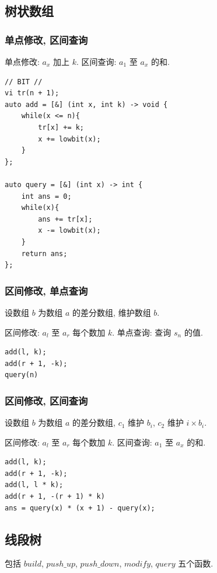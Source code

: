 \documentclass[UTF8, a4paper, titlepage, twoside]{ctexart}
\begin{document}
\subsection{ 树状数组 }

\subsubsection{ 单点修改, 区间查询 }
单点修改: $a_x$ 加上 $k$.
区间查询: $a_1$ 至 $a_x$ 的和.
\begin{lstlisting}[style = cpp]
// BIT //
vi tr(n + 1);
auto add = [&] (int x, int k) -> void {
    while(x <= n){
        tr[x] += k;
        x += lowbit(x);
    }
};

auto query = [&] (int x) -> int {
    int ans = 0;
    while(x){
        ans += tr[x];
        x -= lowbit(x);
    }
    return ans;
};
\end{lstlisting}

\subsubsection{ 区间修改, 单点查询 }
设数组 $b$ 为数组 $a$ 的差分数组, 维护数组 $b$.

区间修改: $a_l$ 至 $a_r$ 每个数加 $k$.
单点查询: 查询 $s_n$ 的值.
\begin{lstlisting}[style = cpp]
add(l, k);
add(r + 1, -k);
query(n)
\end{lstlisting}

\subsubsection{ 区间修改, 区间查询 }
设数组 $b$ 为数组 $a$ 的差分数组, $c_1$ 维护 $b_i$, $c_2$ 维护 $i \times b_i$.

区间修改: $a_l$ 至 $a_r$ 每个数加 $k$.
区间查询: $a_1$ 至 $a_x$ 的和.
\begin{lstlisting}[style = cpp]
add(l, k);
add(r + 1, -k);
add(l, l * k);
add(r + 1, -(r + 1) * k)
ans = query(x) * (x + 1) - query(x);
\end{lstlisting}

\subsection{ 线段树 }
包括 $build$, $push\_up$, $push\_down$, $modify$, $query$ 五个函数. 
\end{document}
